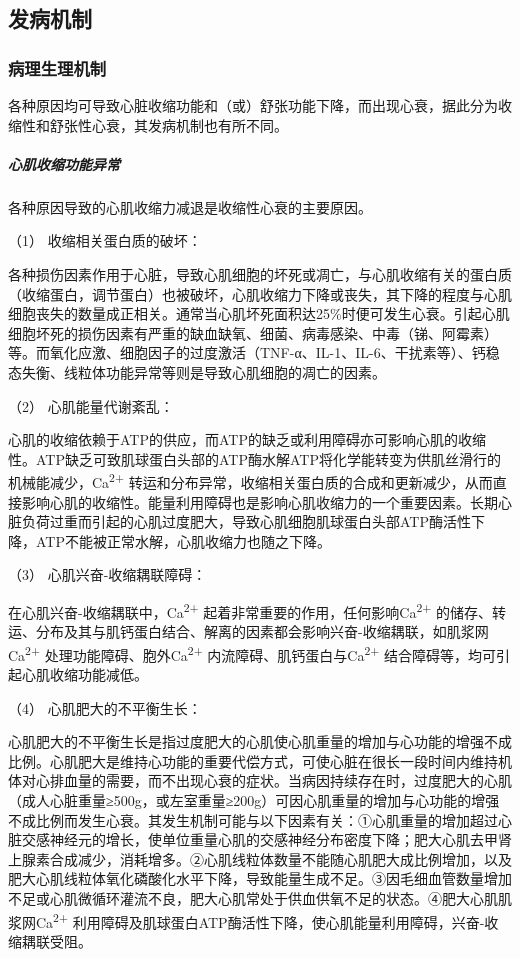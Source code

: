 \subsection{发病机制}

\subsubsection{病理生理机制}

各种原因均可导致心脏收缩功能和（或）舒张功能下降，而出现心衰，据此分为收缩性和舒张性心衰，其发病机制也有所不同。

\subparagraph{心肌收缩功能异常}

各种原因导致的心肌收缩力减退是收缩性心衰的主要原因。

\hypertarget{text00072.htmlux5cux23CHP3-3-1-2-1-1-1}{}
（1） 收缩相关蛋白质的破坏：

各种损伤因素作用于心脏，导致心肌细胞的坏死或凋亡，与心肌收缩有关的蛋白质（收缩蛋白，调节蛋白）也被破坏，心肌收缩力下降或丧失，其下降的程度与心肌细胞丧失的数量成正相关。通常当心肌坏死面积达25\%时便可发生心衰。引起心肌细胞坏死的损伤因素有严重的缺血缺氧、细菌、病毒感染、中毒（锑、阿霉素）等。而氧化应激、细胞因子的过度激活（TNF-α、IL-1、IL-6、干扰素等）、钙稳态失衡、线粒体功能异常等则是导致心肌细胞的凋亡的因素。

\hypertarget{text00072.htmlux5cux23CHP3-3-1-2-1-1-2}{}
（2） 心肌能量代谢紊乱：

心肌的收缩依赖于ATP的供应，而ATP的缺乏或利用障碍亦可影响心肌的收缩性。ATP缺乏可致肌球蛋白头部的ATP酶水解ATP将化学能转变为供肌丝滑行的机械能减少，Ca\textsuperscript{2+}
转运和分布异常，收缩相关蛋白质的合成和更新减少，从而直接影响心肌的收缩性。能量利用障碍也是影响心肌收缩力的一个重要因素。长期心脏负荷过重而引起的心肌过度肥大，导致心肌细胞肌球蛋白头部ATP酶活性下降，ATP不能被正常水解，心肌收缩力也随之下降。

\hypertarget{text00072.htmlux5cux23CHP3-3-1-2-1-1-3}{}
（3） 心肌兴奋-收缩耦联障碍：

在心肌兴奋-收缩耦联中，Ca\textsuperscript{2+}
起着非常重要的作用，任何影响Ca\textsuperscript{2+}
的储存、转运、分布及其与肌钙蛋白结合、解离的因素都会影响兴奋-收缩耦联，如肌浆网Ca\textsuperscript{2+}
处理功能障碍、胞外Ca\textsuperscript{2+}
内流障碍、肌钙蛋白与Ca\textsuperscript{2+}
结合障碍等，均可引起心肌收缩功能减低。

\hypertarget{text00072.htmlux5cux23CHP3-3-1-2-1-1-4}{}
（4） 心肌肥大的不平衡生长：

心肌肥大的不平衡生长是指过度肥大的心肌使心肌重量的增加与心功能的增强不成比例。心肌肥大是维持心功能的重要代偿方式，可使心脏在很长一段时间内维持机体对心排血量的需要，而不出现心衰的症状。当病因持续存在时，过度肥大的心肌（成人心脏重量≥500g，或左室重量≥200g）可因心肌重量的增加与心功能的增强不成比例而发生心衰。其发生机制可能与以下因素有关：①心肌重量的增加超过心脏交感神经元的增长，使单位重量心肌的交感神经分布密度下降；肥大心肌去甲肾上腺素合成减少，消耗增多。②心肌线粒体数量不能随心肌肥大成比例增加，以及肥大心肌线粒体氧化磷酸化水平下降，导致能量生成不足。③因毛细血管数量增加不足或心肌微循环灌流不良，肥大心肌常处于供血供氧不足的状态。④肥大心肌肌浆网Ca\textsuperscript{2+}
利用障碍及肌球蛋白ATP酶活性下降，使心肌能量利用障碍，兴奋-收缩耦联受阻。

